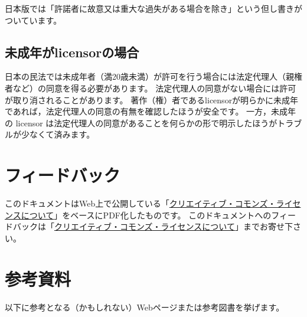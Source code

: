 \documentclass{ltjsarticle}
\begin{document}
日本版では「許諾者に故意又は重大な過失がある場合を除き」という但し書きがついています。


\subsection{未成年がlicensorの場合}

日本の民法では未成年者（満20歳未満）が許可を行う場合には法定代理人（親権者など）の同意を得る必要があります。
法定代理人の同意がない場合には許可が取り消されることがあります。
著作（権）者であるlicensorが明らかに未成年であれば，法定代理人の同意の有無を確認したほうが安全です。
一方，未成年の licensor は法定代理人の同意があることを何らかの形で明示したほうがトラブルが少なくて済みます。


\section{フィードバック}

このドキュメントはWeb上で公開している「\href{http://www.baldanders.info/cc-license.shtml#aboutCC}{クリエイティブ・コモンズ・ライセンスについて}」をベースにPDF化したものです。
このドキュメントへのフィードバックは「\href{http://www.baldanders.info/cc-license.shtml#aboutCC}{クリエイティブ・コモンズ・ライセンスについて}」までお寄せ下さい。


\section{参考資料}

以下に参考となる（かもしれない）Webページまたは参考図書を挙げます。
\end{document}
